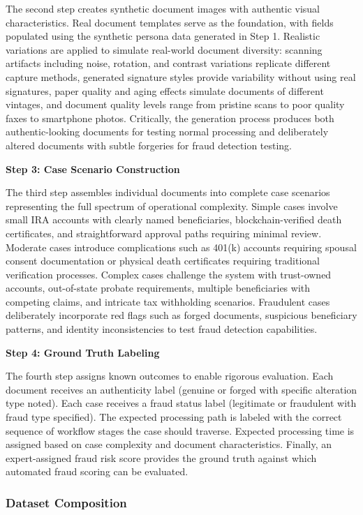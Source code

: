 The second step creates synthetic document images with authentic visual characteristics. Real document templates serve as the foundation, with fields populated using the synthetic persona data generated in Step 1. Realistic variations are applied to simulate real-world document diversity: scanning artifacts including noise, rotation, and contrast variations replicate different capture methods, generated signature styles provide variability without using real signatures, paper quality and aging effects simulate documents of different vintages, and document quality levels range from pristine scans to poor quality faxes to smartphone photos. Critically, the generation process produces both authentic-looking documents for testing normal processing and deliberately altered documents with subtle forgeries for fraud detection testing.

\textbf{Step 3: Case Scenario Construction}

The third step assembles individual documents into complete case scenarios representing the full spectrum of operational complexity. Simple cases involve small IRA accounts with clearly named beneficiaries, blockchain-verified death certificates, and straightforward approval paths requiring minimal review. Moderate cases introduce complications such as 401(k) accounts requiring spousal consent documentation or physical death certificates requiring traditional verification processes. Complex cases challenge the system with trust-owned accounts, out-of-state probate requirements, multiple beneficiaries with competing claims, and intricate tax withholding scenarios. Fraudulent cases deliberately incorporate red flags such as forged documents, suspicious beneficiary patterns, and identity inconsistencies to test fraud detection capabilities.

\textbf{Step 4: Ground Truth Labeling}

The fourth step assigns known outcomes to enable rigorous evaluation. Each document receives an authenticity label (genuine or forged with specific alteration type noted). Each case receives a fraud status label (legitimate or fraudulent with fraud type specified). The expected processing path is labeled with the correct sequence of workflow stages the case should traverse. Expected processing time is assigned based on case complexity and document characteristics. Finally, an expert-assigned fraud risk score provides the ground truth against which automated fraud scoring can be evaluated.

\subsubsection{Dataset Composition}


